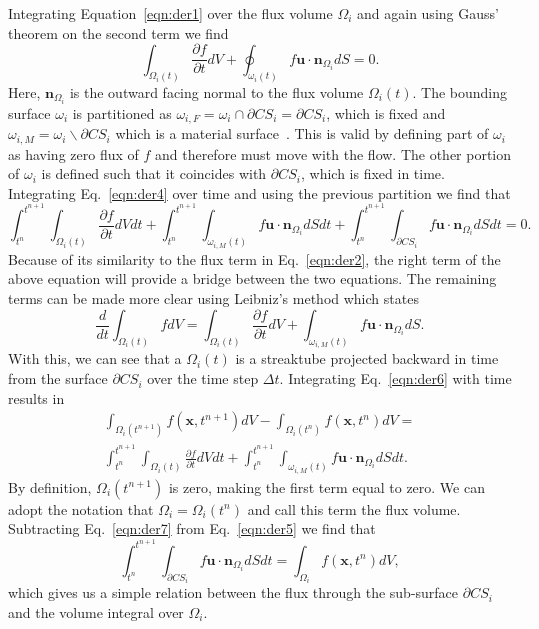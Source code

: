 Integrating Equation~\ref{eqn:der1} over the flux volume $\Omega_i$ and again using Gauss' theorem on the second term we find 
\begin{equation}
\int_{\Omega_i(t)} \frac{\partial f}{\partial t} dV  + \oint_{\omega_i(t)} f \bm{u} \cdot \bm{n}_{\Omega_i} dS = 0.
\label{eqn:der4}
\end{equation}
Here, $\bm{n}_{\Omega_i}$ is the outward facing normal to the flux volume $\Omega_i(t)$. The bounding surface $\omega_i$ is partitioned as $\omega_{i,F} = \omega_i \cap \partial CS_i = \partial CS_i$, which is fixed and $\omega_{i,M} = \omega_i \backslash \partial CS_i $ which is a material surface~\cite{Owkes2017}. This is valid by defining part of $\omega_i$ as having zero flux of $f$ and therefore must move with the flow. The other portion of $\omega_i$ is defined such that it coincides with $\partial CS_i$, which is fixed in time. Integrating Eq.~\ref{eqn:der4} over time and using the previous partition we find that 
\begin{equation}
\int_{t^n}^{t^{n+1}} \int_{\Omega_i(t)} \frac{\partial f}{\partial t} dV dt + \int_{t^n}^{t^{n+1}} \int_{\omega_{i,M}(t)} f \bm{u} \cdot \bm{n}_{\Omega_i} dS dt + 	\int_{t^n}^{t^{n+1}} \int_{\partial CS_i} f \bm{u} \cdot \bm{n}_{\Omega_i} dS dt = 0.
\label{eqn:der5}
\end{equation}
Because of its similarity to the flux term in Eq.~\ref{eqn:der2}, the right term of the above equation will provide a bridge between the two equations. The remaining terms can be made more clear using Leibniz's method which states 
\begin{equation}
\frac{d}{dt} \int_{\Omega_i(t)} f dV = \int_{\Omega_i(t)} \frac{\partial f}{\partial t} dV + \int_{\omega_{i,M}(t)} f \bm{u} \cdot \bm{n}_{\Omega_i} dS.
\label{eqn:der6}
\end{equation}
With this, we can see that a $\Omega_i(t)$ is a streaktube projected backward in time from the surface $\partial CS_i$ over the time step $\Delta t$. Integrating Eq.~\ref{eqn:der6} with time results in 
\begin{multline}
\int_{\Omega_i(t^{n+1})} f (\bm{x} , t^{n+1}) dV - \int_{\Omega_i(t^{n})} f (\bm{x} , t^{n}) dV  = \\ \int_{t^n}^{t^{n+1}}\int_{\Omega_i(t)} \frac{\partial f}{\partial t} dV dt+ \int_{t^n}^{t^{n+1}} \int_{\omega_{i,M}(t)} f \bm{u} \cdot \bm{n}_{\Omega_i} dS dt.
\label{eqn:der7}
\end{multline}
By definition, $\Omega_i(t^{n+1})$ is zero, making the first term equal to zero. We can adopt the notation that $\Omega_i=\Omega_i(t^{n})$ and call this term the flux volume. Subtracting Eq.~\ref{eqn:der7} from Eq.~\ref{eqn:der5} we find that 
\begin{equation}
\int_{t^n}^{t^{n+1}}\int_{\partial CS_i}  f \bm{u} \cdot \bm{n}_{\Omega_i} dS dt = \int_{\Omega_i} f (\bm{x} , t^{n}) dV, 
\label{eqn:der8}
\end{equation}
which gives us a simple relation between the flux through the sub-surface $\partial CS_i$ and the volume integral over $\Omega_i$.

